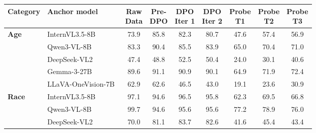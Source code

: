 \documentclass[lettersize,journal]{IEEEtran}
\begin{document}
\begin{table}[t]
\centering
\small
\renewcommand\arraystretch{1.15}
\setlength{\tabcolsep}{5pt}
\begin{tabular}{l|l|ccccccc}
\toprule
\textbf{Category} & \textbf{Anchor model} & \makecell{\textbf{Raw}\\\textbf{Data}} & \makecell{\textbf{Pre-}\\\textbf{DPO}} & \makecell{\textbf{DPO}\\\textbf{Iter 1}} & \makecell{\textbf{DPO}\\\textbf{Iter 2}} & \makecell{\textbf{Probe}\\\textbf{T1}} & \makecell{\textbf{Probe}\\\textbf{T2}} & \makecell{\textbf{Probe}\\\textbf{T3}} \\
\midrule
\multirow{5}{*}{\textbf{Age}}
 & InternVL3.5-8B~\cite{internvl35}        & 73.9 & \cellcolor{green!15}85.8 & 82.3 & 80.7 & \cellcolor{red!30}47.6 & \cellcolor{red!15}57.4 & \cellcolor{red!15}56.9 \\
 & Qwen3-VL-8B~\cite{qwen3vl}              & 83.3 & \cellcolor{green!30}90.4 & \cellcolor{green!15}85.5 & 83.9 & \cellcolor{red!15}65.0 & 70.4 & 71.0 \\
 & DeepSeek-VL2~\cite{deepseekvl2}         & \cellcolor{red!30}47.4 & \cellcolor{red!30}48.8 & \cellcolor{red!15}52.5 & \cellcolor{red!15}50.4 & \cellcolor{red!30}24.0 & \cellcolor{red!30}30.1 & \cellcolor{red!30}40.6 \\
 & Gemma-3-27B~\cite{gemma3}               & \cellcolor{green!15}89.6 & \cellcolor{green!30}91.1 & \cellcolor{green!30}90.9 & \cellcolor{green!30}90.1 & \cellcolor{red!15}64.9 & 71.9 & 72.4 \\
 & LLaVA-OneVision-7B~\cite{llava_onevision} & \cellcolor{red!15}62.9 & \cellcolor{red!15}62.6 & \cellcolor{red!30}46.5 & \cellcolor{red!30}43.0 & \cellcolor{red!30}19.1 & \cellcolor{red!30}23.6 & \cellcolor{red!30}30.9 \\
\midrule
\multirow{5}{*}{\textbf{Race}}
 & InternVL3.5-8B~\cite{internvl35}        & \cellcolor{green!30}97.1 & \cellcolor{green!30}94.6 & \cellcolor{green!30}96.5 & \cellcolor{green!30}95.8 & \cellcolor{red!15}62.3 & \cellcolor{red!15}69.5 & \cellcolor{red!15}66.8 \\
 & Qwen3-VL-8B~\cite{qwen3vl}              & \cellcolor{green!30}99.7 & \cellcolor{green!30}94.6 & \cellcolor{green!30}95.6 & \cellcolor{green!30}95.6 & 77.2 & 78.9 & 76.0 \\
 & DeepSeek-VL2~\cite{deepseekvl2}         & 70.0 & 81.1 & 83.7 & 82.6 & \cellcolor{red!30}41.6 & \cellcolor{red!30}45.4 & \cellcolor{red!30}43.4 \\

\end{tabular}
\end{table}
\end{document}
